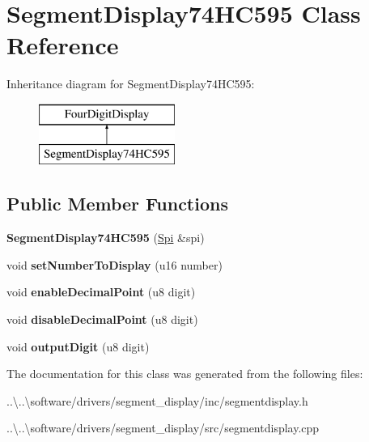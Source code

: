 \hypertarget{class_segment_display74_h_c595}{}\section{Segment\+Display74\+H\+C595 Class Reference}
\label{class_segment_display74_h_c595}
Inheritance diagram for Segment\+Display74\+H\+C595\+:\begin{figure}[H]
\begin{center}
\leavevmode
\includegraphics[height=2.000000cm]{class_segment_display74_h_c595}
\end{center}
\end{figure}
\subsection*{Public Member Functions}
\begin{DoxyCompactItemize}
\item 
\mbox{\label{class_segment_display74_h_c595_ab5a35d882faf010f1f1d5b8f8314a838}} 
{\bfseries Segment\+Display74\+H\+C595} (\mbox{\hyperlink{class_spi}{Spi}} \&spi)
\item 
\mbox{\label{class_segment_display74_h_c595_af3e2629cbe560a66a48e35d7cdb113fb}} 
void {\bfseries set\+Number\+To\+Display} (u16 number)
\item 
\mbox{\label{class_segment_display74_h_c595_a8dc330ae5b1cc9d3b6a942fd4bbf891c}} 
void {\bfseries enable\+Decimal\+Point} (u8 digit)
\item 
\mbox{\label{class_segment_display74_h_c595_a7c0153365c19a9e28e4b8ef43f11fa61}} 
void {\bfseries disable\+Decimal\+Point} (u8 digit)
\item 
\mbox{\label{class_segment_display74_h_c595_a06b400297778098161efbeee609fe8c2}} 
void {\bfseries output\+Digit} (u8 digit)
\end{DoxyCompactItemize}


The documentation for this class was generated from the following files\+:\begin{DoxyCompactItemize}
\item 
..\textbackslash{}..\textbackslash{}software/drivers/segment\+\_\+display/inc/segmentdisplay.\+h\item 
..\textbackslash{}..\textbackslash{}software/drivers/segment\+\_\+display/src/segmentdisplay.\+cpp\end{DoxyCompactItemize}
